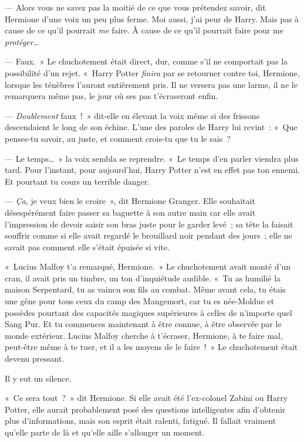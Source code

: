 --- Alors vous ne savez pas la moitié de ce que vous prétendez savoir, dit Hermione d'une voix un peu plus ferme. Moi aussi, j'ai peur de Harry. Mais pas à cause de ce qu'il pourrait \emph{me} faire. À cause de ce qu'il pourrait faire pour me \emph{protéger}…

--- Faux.~» Le chuchotement était direct, dur, comme s'il ne comportait pas la possibilité d'un rejet. «~Harry Potter \emph{finira} par se retourner contre toi, Hermione, lorsque les ténèbres l'auront entièrement pris. Il ne versera pas une larme, il ne le remarquera même pas, le jour où ses pas t'écraseront enfin.

--- \emph{Doublement} faux~!~» dit-elle en élevant la voix même si des frissons descendaient le long de son échine. L'une des paroles de Harry lui revint~: «~Que penses-tu savoir, au juste, et comment crois-tu que tu le sais~?

--- Le temps…~» la voix sembla se reprendre. «~Le temps d'en parler viendra plus tard. Pour l'instant, pour aujourd'hui, Harry Potter n'est en effet pas ton ennemi. Et pourtant tu cours un terrible danger.

--- \emph{Ça}, je veux bien le croire~», dit Hermione Granger. Elle souhaitait désespérément faire passer sa baguette à son autre main car elle avait l'impression de devoir saisir son bras juste pour le garder levé~; sa tête la faisait souffrir comme si elle avait regardé le brouillard noir pendant des jours~; elle ne savait pas comment elle s'était épuisée si vite.

«~Lucius Malfoy t'a remarqué, Hermione.~» Le chuchotement avait monté d'un cran, il avait pris un timbre, un ton d'inquiétude audible. «~Tu as humilié la maison Serpentard, tu as vaincu son fils au combat. Même avant cela, tu étais une gêne pour tous ceux du camp des Mangemort, car tu es née-Moldue et possèdes pourtant des capacités magiques supérieures à celles de n'importe quel Sang Pur. Et tu commences maintenant à être connue, à être observée par le monde extérieur. Lucius Malfoy cherche à t'écraser, Hermione, à te faire mal, peut-être même à te tuer, et il a les moyens de le faire~!~» Le chuchotement était devenu pressant.

Il y eut un silence.

«~Ce sera tout~?~» dit Hermione. Si elle avait été l'ex-colonel Zabini ou Harry Potter, elle aurait probablement posé des questions intelligentes afin d'obtenir plus d'informations, mais son esprit était ralenti, fatigué. Il fallait vraiment qu'elle parte de là et qu'elle aille s'allonger un moment.

